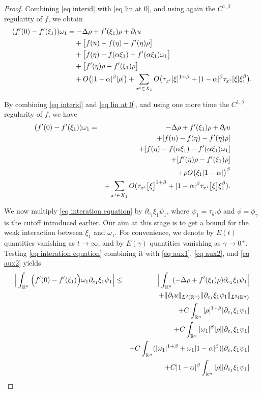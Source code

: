 \documentclass[11pt,letterpaper,reqno]{amsart}
\newcommand{\R}{\mathbb{R}}
\theoremstyle{plain}%
\theoremstyle{definition}
\numberwithin{equation}{section}
\numberwithin{figure}{section}
\begin{document}
\begin{proof}
Combining \eqref{eq interid} with \eqref{eq lin at 0}, and using again the $C^{1,\beta}$ regularity of $f$, we obtain
\begin{align}
(f'(0)-f'(\xi_1))\omega_1
&=
-\Delta\rho
+ f'(\xi_1)\rho
+ \partial_t u
\notag \\
&\quad
+ \big[f(u)-f(\eta)-f'(\eta)\rho\big]
\notag \\
&\quad
+ \big[f(\eta)-f(\alpha\xi_1)-f'(\alpha\xi_1)\omega_1\big]
\notag \\
&\quad
+ \big[f'(\eta)\rho - f'(\xi_1)\rho\big]
\notag \\
&\quad
+ O\big(|1-\alpha|^\beta |\rho|\big)
+ \sum_{x^i\in X_1}
O\big(\tau_{x^i}[\xi]^{1+\beta}
+ |1-\alpha|^\beta \tau_{x^i}[\xi]\xi_1^\beta\big).
\label{eq interation equation}
\end{align}

By combining \eqref{eq interid} and \eqref{eq lin at 0}, and using one more time the $C^{1,\beta}$ regularity of $f$, we have
\begin{eqnarray}\notag
(f'(0) - f'(\xi_1))\omega_1&=&-  \Delta \rho+f'(\xi_1) \rho + \partial_t u  \\\notag
	&&+[f(u)-f(\eta)-f'(\eta)\rho]\\\notag
	&&+ [f(\eta)-f(\alpha\xi_1)-f'( \alpha\xi_1)\omega_1]\\\notag
	&&+ [f'(\eta)\rho-f'(\xi_1)\rho]\\\notag
    &&+ \rho O\big(\xi_1|1-\alpha|\big)^\beta\\\label{eq interation equation}
	&&+ \sum_{x^i \in X_1}O(\tau_{x^i}\big[\xi\big]^{1+\beta}+|1-\alpha|^\beta\tau_{x^i}\big[\xi\big]\xi_1^\beta).
\end{eqnarray}


We now multiply \eqref{eq interation equation} by 
$\partial_{e_1}\xi_1\psi_1$, where 
$\psi_1=\tau_{y^1}\phi$ and $\phi=\phi_\gamma$ is the cutoff introduced earlier. Our aim at this stage is to get a bound for the weak interaction between $\xi_1$ and $\omega_{1}$. For convenience, we denote by $E(t)$ quantities vanishing as $t\to\infty$, and by $E(\gamma)$ quantities vanishing as $\gamma\to0^+$. Testing \eqref{eq interation equation} combining it with \eqref{eq aux1}, \eqref{eq aux2}, and \eqref{eq aux2} yields
\begin{eqnarray}\notag
	\Big|\int_{\R^n}\Big(f'(0) - f'(\xi_1)\Big)\omega_1\partial_{e_1} \xi_1 \psi_1\Big|&\leq& \Big|\int_{\R^n} (-   \Delta \rho+f'(\xi_1) \rho) \partial_{e_1} \xi_1 \psi_1\Big|\\\notag
	&& + \Vert \partial_t u\Vert_{L^2(\R^n)} \Vert \partial_{e_1} \xi_1 \psi_1\Vert_{L^2(\R^n)} \\\notag
	&&+C\int_{\R^n} |\rho|^{1+\beta} |\partial_{e_1} \xi_1 \psi_1|\\\notag
	&&+C\int_{\R^n} |\omega_1|^{\beta}|\rho||\partial_{e_1} \xi_1 \psi_1|\\\notag
	&&+ C\int_{\R^n}(|\omega_1|^{1+\beta}+\omega_1|1-\alpha|^\beta)|\partial_{e_1} \xi_1 \psi_1|\\ \label{eq weak estimate1}
    &&+  C|1-\alpha|^\beta\int_{\R^n} |\rho| |\partial_{e_1} \xi_1 \psi_1|
\end{eqnarray} 


\end{proof}
\end{document}
